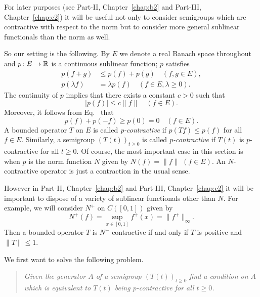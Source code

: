 For later purposes (see Part-II, Chapter~\ref{chap:b2} and Part-III, Chapter~\ref{chap:c2}) it will be useful not only to consider semigroups which are contractive with respect to the norm but to consider more general sublinear functionals than the norm as well.

So our setting is the following.
By $E$ we denote a real Banach space throughout and $p \colon E \to \mathbb{R}$ is a continuous sublinear function; \ie $p$ satisfies
\begin{equation}\label{eq:a2-2.1}
\begin{split}
p(f+g) &\leq p(f) + p(g) \quad (f, g \in E), \\%
p(\lambda f) &= \lambda p(f) \quad (f \in E, \lambda \geq 0). %
\end{split}
\end{equation}
The continuity of\/ $p$ implies that there exists a constant $c > 0$ such that
\begin{equation}\label{eq:a2-2.3}
	|p(f)| \leq c\|f\| \quad (f \in E).
\end{equation}
Moreover, it follows from Eq.~ that
\begin{equation*}\label{eq:a2-2.4}
	p(f) + p(-f) \geq p(0) = 0 \quad (f \in E).
\end{equation*}
A bounded operator $T$ on $E$ is called \emph{p-contractive} if\/ $p(Tf) \leq p(f)$ for all $f \in E$.
Similarly, a semigroup $(T(t))_{t\geq 0}$ is called \emph{p-contractive} if\/ $T(t)$ is $p$-contractive for all $t \geq 0$.
Of course, the most important case in this section is when $p$ is the norm function $N$ given by $N(f) = \|f\|$ $(f \in E)$.
An $N$-contractive operator is just a contraction in the usual sense.
\begin{remark*} \label{rem:a2-2.1-kgk}
However in Part-II, Chapter~\ref{chap:b2} and Part-III, Chapter~\ref{chap:c2} it will be important to dispose of a variety of sublinear functionals other than $N$.
For example, we will consider $N^{+}$ on $C([0,1])$ given by 
%
\[
	N^{+}(f) = \sup_{x \in [0,1]} f^{+}(x) = \|f^{+}\|_{\infty} .
\]
%
Then a bounded operator $T$ is $N^{+}$-contractive if and only if\/ $T$ is positive and $\|T\| \leq 1$.
\end{remark*}
We first want to solve the following problem.
\begin{quote}
\textit{Given the generator $A$ of a semigroup $(T(t))_{t\geq 0}$ find a condition on $A$ which is equivalent to $T(t)$ being $p$-contractive for all $t \geq 0$.}
\end{quote}
